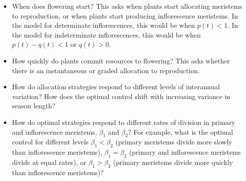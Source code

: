 \documentclass[12pt, oneside]{article}   	%
\begin{document}

\begin{itemize}

\item When does flowering start? This asks when plants start allocating meristems to reproduction, or when plants start producing inflorescence meristems. In the model for determinate inflorescences, this would be when $ p(t) < 1 $. In the model for indeterminate inflorescences, this would be when $ p(t) - q(t) < 1 $ or $ q(t) > 0$.

\item How quickly do plants commit resources to flowering? This asks whether there is an instantaneous or graded allocation to reproduction.

\item How do allocation strategies respond to different levels of interannual variation? How does the optimal control shift with increasing variance in season length? %



\item  How do optimal strategies respond to different rates of division in primary and inflorescence meristems, $\beta_1$ and $\beta_2$? For example, what is the optimal control for different levels $\beta_1<\beta_2$ (primary meristems divide more slowly than inflorescence meristems), $\beta_1=\beta_2$ (primary and inflorescence meristems divide at equal rates), or $\beta_1>\beta_2$ (primary meristems divide more quickly than inflorescence meristems)?


\end{itemize}
\end{document}
